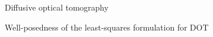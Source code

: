 \documentclass[11pt]{article}%
\renewcommand{\_}{{\fontfamily{ptm}\selectfont\textunderscore}}
\theoremstyle{plain}
\numberwithin{equation}{section}
\begin{document}
\begin{section}{Diffusive optical tomography}
\begin{subsection}{Well-posedness of the least-squares formulation for DOT}
\end{subsection}
%
%


\end{section}
\end{document}
